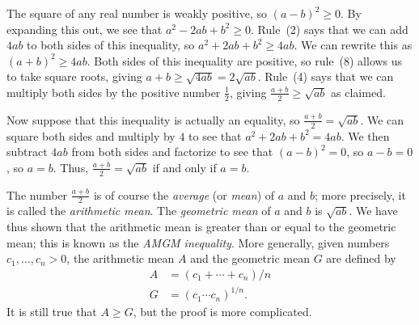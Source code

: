 \documentclass[a4paper]{book}
\newcommand{\PURPLE}[1]{{\color{purple}#1}}
\renewcommand{\:}{\colon}
\newcommand{\DEFN}[1]{\PURPLE{\emph{#1}}}
\theoremstyle{definition}
\renewenvironment{solution}{\SolutionInline}{\endSolutionInline}
\begin{document}
\begin{solution}
 The square of any real number is weakly positive, so
 $(a-b)^2\geq 0$.  By expanding this out, we see that
 $a^2-2ab+b^2\geq 0$.  Rule~(2) says that we can add $4ab$ to both
 sides of this inequality, so $a^2+2ab+b^2\geq 4ab$.  We can rewrite
 this as $(a+b)^2\geq 4ab$.  Both sides of this inequality are
 positive, so rule~(8) allows us to take square roots, giving
 $a+b\geq\sqrt{4ab}=2\sqrt{ab}$.  Rule~(4) says that we can multiply
 both sides by the positive number $\frac{1}{2}$, giving
 $\frac{a+b}{2}\geq\sqrt{ab}$ as claimed.

 Now suppose that this inequality is actually an equality, so
 $\frac{a+b}{2}=\sqrt{ab}$.  We can square both sides and multiply by
 $4$ to see that $a^2+2ab+b^2=4ab$.  We then subtract $4ab$ from both
 sides and factorize to see that $(a-b)^2=0$, so $a-b=0$, so $a=b$.
 Thus, $\frac{a+b}{2}=\sqrt{ab}$ if and only if $a=b$.
\end{solution}
\begin{background}
 The number $\frac{a+b}{2}$ is of course the \DEFN{average} (or
 \DEFN{mean}) of $a$ and $b$; more precisely, it is called the
 \DEFN{arithmetic mean}.  The \DEFN{geometric mean} of $a$ and $b$ is
 $\sqrt{ab}$.  We have thus shown that the arithmetic mean is greater
 than or equal to the geometric mean; this is known as the \DEFN{AMGM
 inequality}.  More generally, given numbers $c_1,\dotsc,c_n>0$, the
 arithmetic mean $A$ and the geometric mean $G$ are defined by
 \begin{align*}
  A &= (c_1 + \dotsb + c_n)/n \\
  G &= (c_1 \dotsm c_n)^{1/n}.
 \end{align*}
 It is still true that $A\geq G$, but the proof is more complicated.
\end{background}
\end{document}
